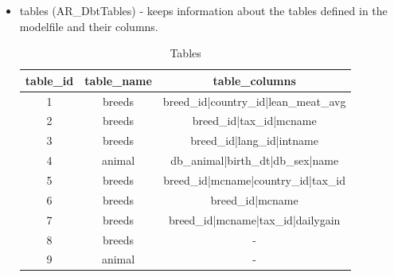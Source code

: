 \begin{itemize}
\item tables (AR\_DbtTables) - keeps information about the tables defined in the modelfile and their columns.

\begin{center}%
\begin{table}[h]
\begin{center}\begin{tabular}{|c|c|c|}
\hline 
table\_id&
table\_name&
table\_columns\tabularnewline
\hline
\hline 1  & breeds    & breed\_id|country\_id|lean\_meat\_avg	\\
\hline 2  & breeds    & breed\_id|tax\_id|mcname             	\\
\hline 3  & breeds    & breed\_id|lang\_id|intname           	\\
\hline 4  & animal    & db\_animal|birth\_dt|db\_sex|name    	\\
\hline 5  & breeds    & breed\_id|mcname|country\_id|tax\_id	\\
\hline 6  & breeds    & breed\_id|mcname			\\
\hline 7  & breeds    & breed\_id|mcname|tax\_id|dailygain	\\
\hline 8  & breeds    &	                 -                	\\ 
\hline 9  & animal    &	                 -                	\\ 
\hline
\end{tabular}\end{center}
\caption{Tables} \label{tables}
\end{table}
\end{center}


\end{itemize}
